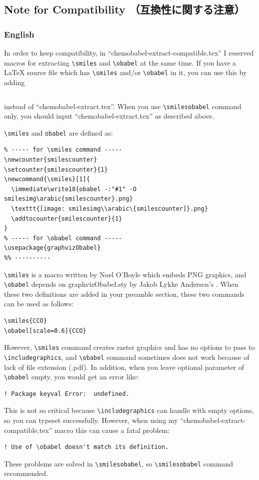 \documentclass[12pt]{jsarticle}
\begin{document}
\clearpage

\subsection{Note for Compatibility （互換性に関する注意）}

\subsubsection{English}

In order to keep compatibility, in ``chemobabel-extract-compatible.tex'' I reserved macros for extracting \verb|\smiles| and \verb|\obabel| at the same time.
If you have a {\LaTeX} source file which has \verb|\smiles| and/or \verb|\obabel| in it, you can use this by adding
\begin{verbatim}

\end{verbatim}
instead of ``chemobabel-extract.tex''.
When you use \verb|\smilesobabel| command only, you should input ``chemobabel-extract.tex'' as described above.

\verb|\smiles| and \verb|obabel| are defined as:
\begin{verbatim}
% ----- for \smiles command -----
\newcounter{smilescounter}
\setcounter{smilescounter}{1}
\newcommand{\smiles}[1]{
  \immediate\write18{obabel -:"#1" -O smilesimg\arabic{smilescounter}.png}
  \texttt{[image: smilesimg\\arabic\{smilescounter]}.png}
  \addtocounter{smilescounter}{1}
}
% ----- for \obabel command -----
\usepackage{graphvizObabel}
%% ----------
\end{verbatim}

\verb|\smiles| is a macro written by Noel O'Boyle \cite{NOB1} which embeds PNG graphics, and \verb|\obabel| depends on \textsf{graphvizObabel.sty} by Jakob Lykke Andersen's \cite{JLA}.
When these two definitions are added in your preamble section, these two commands can be used as follows:
\begin{verbatim}
\smiles{CCO}
\obabel[scale=0.6]{CCO}
\end{verbatim}
However, \verb|\smiles| command creates raster graphics and has no options to pass to \verb|\includegraphics|, and \verb|\obabel| command sometimes does not work because of lack of file extension (.pdf). In addition, when you leave optional parameter of \verb|\obabel| empty, you would get an error like:
\begin{verbatim}
! Package keyval Error:  undefined.
\end{verbatim}
This is not so critical because \verb|\includegraphics| can handle with empty options, so you can typeset successfully.
However, when using my ``chemobabel-extract-compatible.tex'' macro this can cause a fatal problem:
\begin{verbatim}
! Use of \obabel doesn't match its definition.
\end{verbatim}
These problems are solved in \verb|\smilesobabel|, so \verb|\smilesobabel| command recommended.
\end{document}
